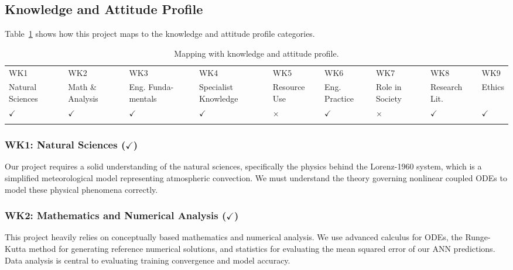 \subsection{Knowledge and Attitude Profile}

Table~\ref{tab:k_profile} shows how this project maps to the knowledge and attitude profile categories.

\begin{center}
    \begin{table}[ht]
        \centering
        \caption{Mapping with knowledge and attitude profile.}
        \begin{tabular}{|p{}|p{}|p{}|p{}|p{}|p{}|p{}|p{}|p{}|}
        \hline
        WK1& WK2& WK3& WK4& WK5& WK6& WK7& WK8& WK9\\
        Natural Sciences & Math \& Analysis & Eng. Funda- mentals & Specialist Knowledge & Resource Use & Eng. Practice & Role in Society & Research Lit. & Ethics\\
        \hline 
        $\checkmark$ & $\checkmark$ & $\checkmark$ & $\checkmark$ & $\times$ & $\checkmark$ & $\times$ & $\checkmark$ & $\checkmark$\\
        &&&&&&&&\\
        \hline 
        \end{tabular}
        \label{tab:k_profile}
    \end{table}
\end{center}

\subsubsection{WK1: Natural Sciences ($\checkmark$)}

Our project requires a solid understanding of the natural sciences, specifically the physics behind the Lorenz-1960 system, which is a simplified meteorological model representing atmospheric convection. We must understand the theory governing nonlinear coupled ODEs to model these physical phenomena correctly.

\subsubsection{WK2: Mathematics and Numerical Analysis ($\checkmark$)}

This project heavily relies on conceptually based mathematics and numerical analysis. We use advanced calculus for ODEs, the Runge-Kutta method for generating reference numerical solutions, and statistics for evaluating the mean squared error of our ANN predictions. Data analysis is central to evaluating training convergence and model accuracy.

